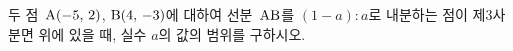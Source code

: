 두 점~$\mathrm{A}(-5,\mkern3mu 2)$, $\mathrm{B}(4,\mkern3mu -3)$에 대하여 선분~$\mathrm{AB}$를 $(1-a):a$로 내분하는 점이 제$3$사분면 위에 있을 때, 실수 $a$의 값의 범위를 구하시오. 
